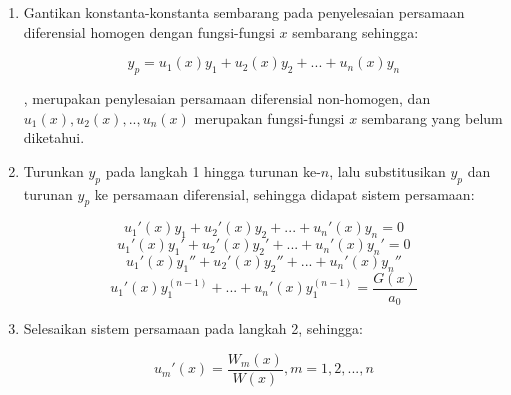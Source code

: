\begin{enumerate}[1.]

	\item Gantikan konstanta-konstanta sembarang pada penyelesaian persamaan diferensial homogen dengan fungsi-fungsi \begin{math} x \end{math} sembarang sehingga:
	
	\begin{equation} y_p = u_1 (x) y_1 + u_2 (x) y_2 + ... + u_n (x) y_n \end{equation}

	, merupakan penylesaian persamaan diferensial non-homogen, dan \begin{math} u_1 (x), u_2 (x), .., u_n (x) \end{math} merupakan fungsi-fungsi \begin{math} x \end{math} sembarang yang belum diketahui.

	\item Turunkan \begin{math} y_p \end{math} pada langkah 1 hingga turunan ke-\begin{math} n \end{math}, lalu substitusikan \begin{math} y_p \end{math} dan turunan \begin{math} y_p \end{math} ke persamaan diferensial, sehingga didapat sistem persamaan:
	
	\begin{displaymath} u_1 ' (x) y_1 + u_2 ' (x) y_2 + ... + u_n ' (x) y_n = 0 \end{displaymath}
	\begin{displaymath} u_1 ' (x) y_1 ' + u_2 ' (x) y_2 ' + ... + u_n ' (x) y_n ' = 0\end{displaymath}
	\begin{displaymath} u_1 ' (x) y_1 '' + u_2 ' (x) y_2 '' + ... + u_n ' (x) y_n '' \end{displaymath}
	\begin{equation} u_1 ' (x) y^{(n - 1)}_1 + ... + u_n ' (x) y^{(n - 1)}_1 = \dfrac{G(x)}{a_0} \end{equation}

	\item Selesaikan sistem persamaan pada langkah 2, sehingga:

	\begin{equation} u_m ' (x) = \dfrac{W_m (x)}{W(x)}, m = 1, 2, ..., n \end{equation}


\end{enumerate}
